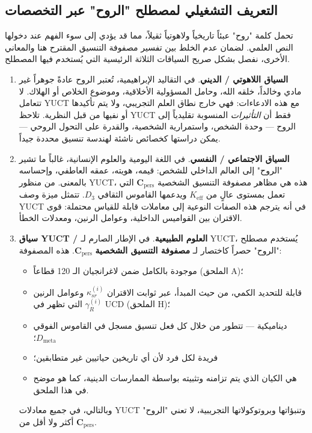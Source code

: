 \documentclass[12pt,a4paper]{article}
\begin{document}
	\subsection{التعريف التشغيلي لمصطلح "الروح" عبر التخصصات}
	\label{subsec:soul-definition}
	
	تحمل كلمة "روح" عبئاً تاريخياً ولاهوتياً ثقيلاً، مما قد يؤدي إلى سوء الفهم عند دخولها النص العلمي. لضمان عدم الخلط بين تفسير مصفوفة التنسيق المقترح هنا والمعاني الأخرى، نفصل بشكل صريح السياقات الثلاثة الرئيسية التي يُستخدم فيها المصطلح.
	
	\begin{enumerate}[leftmargin=*]
		\item \textbf{السياق اللاهوتي / الديني}.
		في التقاليد الإبراهيمية، تُعتبر الروح عادةً جوهراً غير مادي وخالداً، خلقه الله، وحامل المسؤولية الأخلاقية، وموضوع الخلاص أو الهلاك. لا تتعامل YUCT مع هذه الادعاءات: فهي خارج نطاق العلم التجريبي، ولا يتم تأكيدها أو نفيها من قبل النظرية. تلاحظ YUCT فقط أن \emph{التأثيرات} المنسوبة تقليدياً إلى الروح — وحدة الشخص، واستمرارية الشخصية، والقدرة على التحول الروحي — يمكن دراستها كخصائص ناشئة لهندسة تنسيق محددة جيداً.
		
		\item \textbf{السياق الاجتماعي / النفسي}.
		في اللغة اليومية والعلوم الإنسانية، غالباً ما تشير "الروح" إلى العالم الداخلي للشخص: قيمه، هويته، عمقه العاطفي، وإحساسه بالمعنى. من منظور YUCT، هذه هي مظاهر مصفوفة التنسيق الشخصية \(\mathbf{C}_{\text{pers}}\) التي تعمل بمستوى عالٍ من \(K_{\mathrm{eff}}\) ويدعمها القاموس الثقافي \(D_3\). تتمثل ميزة وصف YUCT في أنه يترجم هذه الصفات النوعية إلى معاملات قابلة للقياس محتملة: قوى الاقتران بين القواميس الداخلية، وعوامل الرنين، ومعدلات الخطأ.
		
		\item \textbf{سياق YUCT / العلوم الطبيعية}.
		في الإطار الصارم لـ YUCT، يُستخدم مصطلح "الروح" حصراً كاختصار لـ \textbf{مصفوفة التنسيق الشخصية} \(\mathbf{C}_{\text{pers}}\). هذه المصفوفة:
		\begin{itemize}
			\item موجودة بالكامل ضمن لاغرانجيان الـ 120 قطاعاً (الملحق A)؛
			\item قابلة للتحديد الكمي، من حيث المبدأ، عبر ثوابت الاقتران \(\kappa_{sr}^{(i)}\) وعوامل الرنين \(\gamma_R^{(i)}\) التي تظهر في UCD (الملحق H)؛
			\item ديناميكية — تتطور من خلال كل فعل تنسيق مسجل في القاموس الفوقي \(D_{\text{meta}}\)؛
			\item فريدة لكل فرد لأن أي تاريخين حياتيين غير متطابقين؛
			\item هي الكيان الذي يتم تزامنه وتثبيته بواسطة الممارسات الدينية، كما هو موضح في هذا الملحق.
		\end{itemize}
		وبالتالي، في جميع معادلات YUCT وتنبؤاتها وبروتوكولاتها التجريبية، لا تعني "الروح" أكثر ولا أقل من \(\mathbf{C}_{\text{pers}}\).
	\end{enumerate}
	
\end{document}

